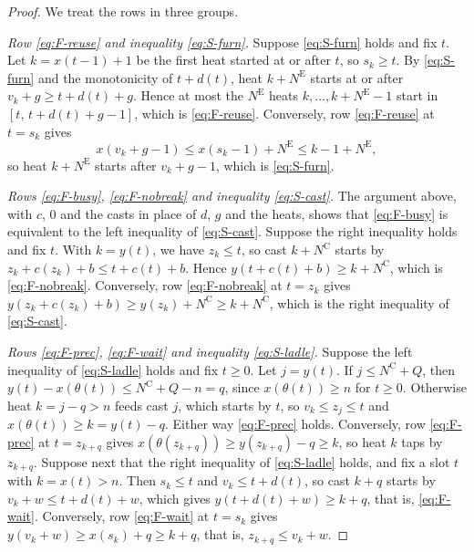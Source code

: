 \documentclass[11pt]{article}
\newcommand{\NE}{N^{\mathrm{E}}}
\newcommand{\NC}{N^{\mathrm{C}}}
\begin{document}
\begin{proof}
We treat the rows in three groups.

\emph{Row \eqref{eq:F-reuse} and inequality \eqref{eq:S-furn}.} Suppose \eqref{eq:S-furn} holds and fix $t$. Let
$k=x(t-1)+1$ be the first heat started at or after $t$, so $s_k\ge t$. By \eqref{eq:S-furn} and the monotonicity of
$t+d(t)$, heat $k+\NE$ starts at or after $v_k+g\ge t+d(t)+g$. Hence at most the $\NE$ heats $k,\dots,k+\NE-1$ start in
$[t,\,t+d(t)+g-1]$, which is \eqref{eq:F-reuse}. Conversely, row \eqref{eq:F-reuse} at $t=s_k$ gives
\[
x(v_k+g-1)\le x(s_k-1)+\NE\le k-1+\NE,
\]
so heat $k+\NE$ starts after $v_k+g-1$, which is \eqref{eq:S-furn}.

\emph{Rows \eqref{eq:F-busy}, \eqref{eq:F-nobreak} and inequality \eqref{eq:S-cast}.} The argument above, with $c$,
$0$ and the casts in place of $d$, $g$ and the heats, shows that \eqref{eq:F-busy} is equivalent to the left inequality
of \eqref{eq:S-cast}. Suppose the right inequality holds and fix $t$. With $k=y(t)$, we have $z_k\le t$, so cast
$k+\NC$ starts by $z_k+c(z_k)+b\le t+c(t)+b$. Hence $y(t+c(t)+b)\ge k+\NC$, which is \eqref{eq:F-nobreak}.
Conversely, row \eqref{eq:F-nobreak} at $t=z_k$ gives $y(z_k+c(z_k)+b)\ge y(z_k)+\NC\ge k+\NC$, which is the right
inequality of \eqref{eq:S-cast}.

\emph{Rows \eqref{eq:F-prec}, \eqref{eq:F-wait} and inequality \eqref{eq:S-ladle}.} Suppose the left inequality of
\eqref{eq:S-ladle} holds and fix $t\ge0$. Let $j=y(t)$. If $j\le\NC+Q$, then $y(t)-x(\theta(t))\le\NC+Q-n=q$, since
$x(\theta(t))\ge n$ for $t\ge0$. Otherwise heat $k=j-q>n$ feeds cast $j$, which starts by $t$, so $v_k\le z_j\le t$ and
$x(\theta(t))\ge k=y(t)-q$. Either way \eqref{eq:F-prec} holds. Conversely, row \eqref{eq:F-prec} at $t=z_{k+q}$ gives
$x(\theta(z_{k+q}))\ge y(z_{k+q})-q\ge k$, so heat $k$ taps by $z_{k+q}$. Suppose next that the right inequality of
\eqref{eq:S-ladle} holds, and fix a slot $t$ with $k=x(t)>n$. Then $s_k\le t$ and $v_k\le t+d(t)$, so cast $k+q$
starts by $v_k+w\le t+d(t)+w$, which gives $y(t+d(t)+w)\ge k+q$, that is, \eqref{eq:F-wait}. Conversely, row
\eqref{eq:F-wait} at $t=s_k$ gives $y(v_k+w)\ge x(s_k)+q\ge k+q$, that is, $z_{k+q}\le v_k+w$.
\end{proof}
\end{document}
